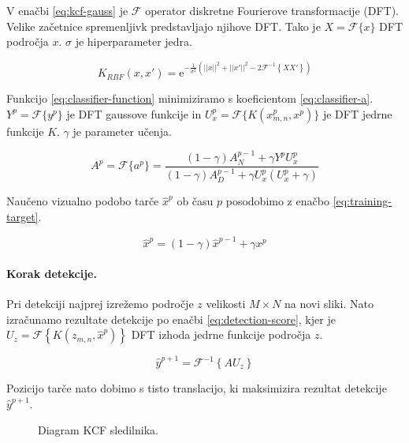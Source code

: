 {V enačbi \eqref{eq:kcf-gauss} je $\mathcal{F}$ operator diskretne Fourierove transformacije (DFT). Velike začetnice spremenljivk predstavljajo njihove DFT. Tako je $X = \mathcal{F}\{ {x} \}$ DFT področja $x$. $\sigma$ je hiperparameter jedra.

\begin{equation}
K_{RBF}({x}, {x}') = \mathrm{e}^{-\frac{1}{\sigma^2}\left(
	||{x}||^2 + ||{x}'||^2 - 2 \mathcal{F}^{-1}\left\{ {X} {X}' \right\}
\right)}
\label{eq:kcf-gauss}
\end{equation}

Funkcijo \eqref{eq:classifier-function} minimiziramo s koeficientom \eqref{eq:classifier-a}.  $Y^p = \mathcal{F}\{y^p\}$ je DFT gaussove funkcije in $U_x^p = \mathcal{F}\{ K(x_{m,n}^p, x^p) \}$ je DFT jedrne funkcije $K$. $\gamma$ je parameter učenja.

\begin{equation}
A^p = \mathcal{F}\{a^p\} =  \frac{(1- \gamma) A_N^{p-1} + \gamma Y^p U_x^p}
{(1- \gamma)A_D^{p-1} + \gamma U_x^p\left( U_x^p + \gamma \right)}
\label{eq:classifier-a}
\end{equation}

Naučeno vizualno podobo tarče $\hat{x}^p$ ob času $p$ posodobimo z enačbo \eqref{eq:training-target}.

\begin{equation}
\hat{x}^p = (1 - \gamma) \hat{x}^{p-1} + \gamma x^p
\label{eq:training-target}
\end{equation}


\paragraph{Korak detekcije.}
Pri detekciji najprej izrežemo področje $z$ velikosti $M \times N$ na novi sliki. Nato izračunamo rezultate detekcije po enačbi \eqref{eq:detection-score}, kjer je $U_z = \mathcal{F}\left\{ K\left( z_{m,n}, \hat{x}^{p}  \right) \right\}$ DFT izhoda jedrne funkcije področja $z$.

\begin{equation}
\hat{y}^{p + 1} = \mathcal{F}^{-1}\left\{ A U_z \right\}
\label{eq:detection-score}
\end{equation}

Pozicijo tarče nato dobimo s tisto translacijo, ki maksimizira rezultat detekcije $\hat{y}^{p+1}$.




\begin{figure}[htb]
\centering

\caption[Diagram KCF sledilnika]{Diagram KCF sledilnika.}
\label{fig:diagram-kcf}
\end{figure}







}
